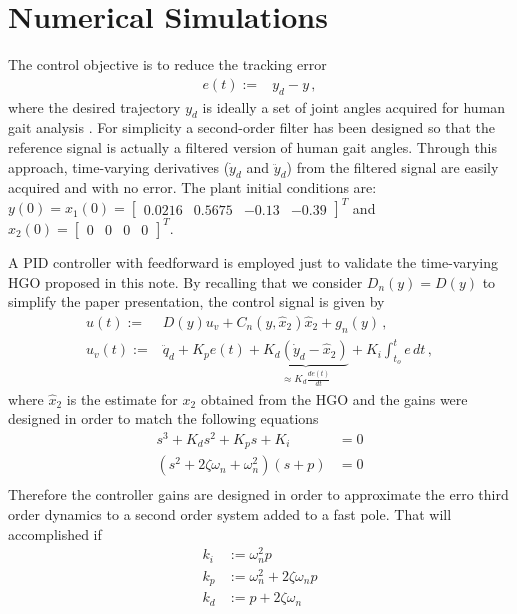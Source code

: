 \documentclass[letterpaper, 10 pt, journal, twocolumn]{IEEEtran}  %
\theoremstyle{plain}
\theoremstyle{definition}
\theoremstyle{remark}
\begin{document}
\section{Numerical Simulations}
\label{sec:Numerical_Simulation}

The control objective is to reduce the tracking error 
%
\begin{align}
e(t) := & y_{d} - y\,,
\end{align}
%
where the desired trajectory $y_d$ is ideally a set of joint angles acquired for human gait analysis \cite{Schwartz2008}. For simplicity a second-order filter has been designed so that the reference signal is actually a filtered version of human gait angles. Through this approach, time-varying derivatives ($\dot{y}_d$ and $\ddot{y}_d$) from the filtered signal are easily acquired and with no error. The plant initial conditions are: $y(0)=x_1(0)=\left[\begin{array}{cccc} 0.0216  & 0.5675 & -0.13 & -0.39\end{array} \right ]^T$ and $x_2(0)=\left[\begin{array}{cccc} 0  & 0 & 0 & 0\end{array} \right ]^T$.


A  PID controller with feedforward is employed just to validate the time-varying HGO proposed in this note. By recalling that we  consider $D_n(y)=D(y)$ to simplify the paper presentation, the control  signal is given by
%
\begin{align}
u(t) := & D(y) u_v + C_{n}(y,\hat{x}_2) \hat{x}_2+g_{n}(y)\,, \\
u_v(t):= &\ddot{q}_d + K_p e(t) + \underbrace{K_d (\dot{y}_d - \hat{x}_2)}_{\approx K_d \frac{de(t)}{dt}} + K_i\int_{t_o}^{t}e \, dt\,,
\label{eq:defu}
\end{align}
%
where $\hat{x}_2$ is the estimate for $x_2$ obtained from the HGO and the gains were designed in order to match the following equations
%
\begin{align}
	s^3 + K_ds^2 + K_ps + K_i &= 0 \\
	(s^2 + 2\zeta \omega_n + \omega_n^2)(s + p) &= 0 \\
\end{align}
%
Therefore the controller gains are designed in order to approximate the erro third order dynamics to a second order system added to a fast pole. That will accomplished if
\begin{align}
	k_i &:= \omega_n^2p \\
	k_p &:= \omega_n^2 + 2\zeta \omega_np \\
	k_d &:= p + 2\zeta \omega_n 
\end{align}
\end{document}
